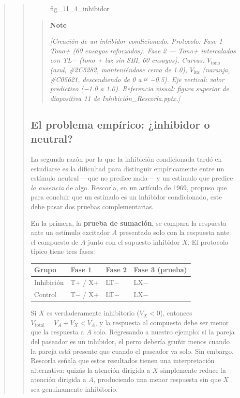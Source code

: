 \documentclass[
  letterpaper,
  DIV=11,
  numbers=noendperiod]{scrreprt}
\begin{document}
\begin{tcolorbox}[enhanced jigsaw, toprule=.15mm, arc=.35mm, colback=white, opacityback=0, colframe=quarto-callout-note-color-frame, breakable, rightrule=.15mm, left=2mm, leftrule=.75mm, bottomrule=.15mm]
\begin{quote}
\begin{quote}
\begin{figure}[H]
{}

\caption{fig\_11\_4\_inhibidor}

\end{figure}%

\begin{quote}
\textbf{Note}

\emph{{[}Creación de un inhibidor condicionado. Protocolo: Fase 1 ---
Tono+ (60 ensayos reforzados). Fase 2 --- Tono+ intercalados con TL−
(tono + luz sin SBI, 60 ensayos). Curvas: \(V_{\text{tono}}\) (azul,
\#2C5282, manteniéndose cerca de 1.0), \(V_{\text{luz}}\) (naranja,
\#C05621, descendiendo de 0 a ≈ −0.5). Eje vertical: valor predictivo
(−1.0 a 1.0). Referencia visual: figura superior de diapositiva 11 de
Inhibición\_Rescorla.pptx.{]}}
\end{quote}

\subsection{El problema empírico: ¿inhibidor o
neutral?}\label{el-problema-empuxedrico-inhibidor-o-neutral}

La segunda razón por la que la inhibición condicionada tardó en
estudiarse es la dificultad para distinguir empíricamente entre un
estímulo neutral ---que no predice nada--- y un estímulo que predice
\emph{la ausencia} de algo. Rescorla, en un artículo de 1969, propuso
que para concluir que un estímulo es un inhibidor condicionado, este
debe pasar dos pruebas complementarias.

En la primera, la \textbf{prueba de sumación}, se compara la respuesta
ante un estímulo excitador \(A\) presentado solo con la respuesta ante
el compuesto de \(A\) junto con el supuesto inhibidor \(X\). El
protocolo típico tiene tres fases:

\begin{longtable}[]{@{}llll@{}}
\toprule\noalign{}
Grupo & Fase 1 & Fase 2 & Fase 3 (prueba) \\
\midrule\noalign{}
\endhead
\bottomrule\noalign{}
\endlastfoot
Inhibición & T+ / X+ & LT− & LX− \\
Control & T− / X+ & LT− & LX− \\
\end{longtable}

Si \(X\) es verdaderamente inhibitorio (\(V_X < 0\)), entonces
\(V_{\text{total}} = V_A + V_X < V_A\), y la respuesta al compuesto debe
ser menor que la respuesta a \(A\) solo. Regresando a nuestro ejemplo:
si la pareja del paseador es un inhibidor, el perro debería gruñir menos
cuando la pareja está presente que cuando el paseador va solo. Sin
embargo, Rescorla señala que estos resultados tienen una interpretación
alternativa: quizás la atención dirigida a \(X\) simplemente reduce la
atención dirigida a \(A\), produciendo una menor respuesta sin que \(X\)
sea genuinamente inhibitorio.


\end{quote}
\end{quote}
\end{tcolorbox}
\end{document}
